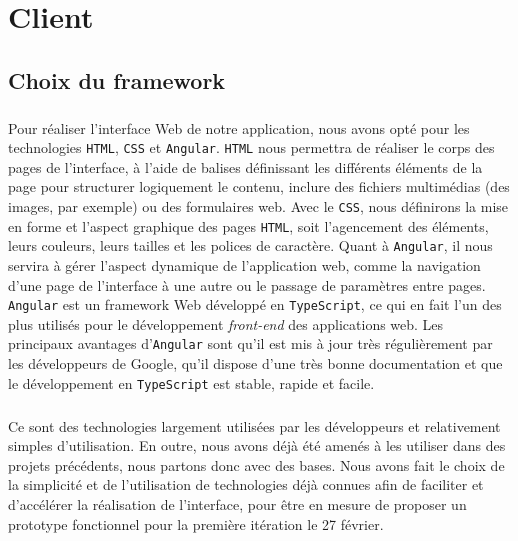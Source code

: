 \chapter{Client}

\section{Choix du framework}

\paragraph{}
Pour réaliser l’interface Web de notre application, nous avons opté pour les technologies \texttt{HTML}, \texttt{CSS} et \texttt{Angular}.
\texttt{HTML} nous permettra de réaliser le corps des pages de l’interface, à l’aide de balises définissant les différents éléments de la page pour structurer logiquement le contenu, inclure des fichiers multimédias (des images, par exemple) ou des formulaires web.
Avec le \texttt{CSS}, nous définirons la mise en forme et l’aspect graphique des pages \texttt{HTML}, soit l’agencement des éléments, leurs couleurs, leurs tailles et les polices de caractère.
Quant à \texttt{Angular}, il nous servira à gérer l’aspect dynamique de l’application web, comme la navigation d’une page de l’interface à une autre ou le passage de paramètres entre pages. \texttt{Angular} est un framework Web développé en \texttt{TypeScript}, ce qui en fait l’un des plus utilisés pour le développement \textit{front-end} des applications web. Les principaux avantages d’\texttt{Angular} sont qu’il est mis à jour très régulièrement par les développeurs de Google, qu’il dispose d’une très bonne documentation et que le développement en \texttt{TypeScript} est stable, rapide et facile.

\paragraph{}
Ce sont des technologies largement utilisées par les développeurs et relativement simples d’utilisation. En outre, nous avons déjà été amenés à les utiliser dans des projets précédents, nous partons donc avec des bases. Nous avons fait le choix de la simplicité et de l’utilisation de technologies déjà connues afin de faciliter et d’accélérer la réalisation de l’interface, pour être en mesure de proposer un prototype fonctionnel pour la première itération le 27 février.

